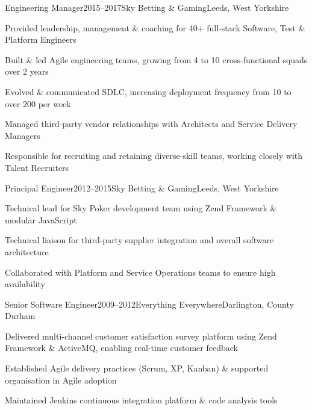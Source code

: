 \documentclass{cv}
\begin{document}

\begin{experience}{Engineering Manager}{2015--2017}{Sky Betting \& Gaming}{Leeds, West Yorkshire}
\item Provided leadership, management \& coaching for 40+ full-stack Software, Test \& Platform Engineers
\item Built \& led Agile engineering teams, growing from 4 to 10 cross-functional squads over 2 years
\item Evolved \& communicated SDLC, increasing deployment frequency from 10 to over 200 per week
\item Managed third-party vendor relationships with Architects and Service Delivery Managers
\item Responsible for recruiting and retaining diverse-skill teams, working closely with Talent Recruiters
\end{experience}


\begin{experience}{Principal Engineer}{2012--2015}{Sky Betting \& Gaming}{Leeds, West Yorkshire}
\item Technical lead for Sky Poker development team using Zend Framework \& modular JavaScript
\item Technical liaison for third-party supplier integration and overall software architecture
\item Collaborated with Platform and Service Operations teams to ensure high availability
\end{experience}


\begin{experience}{Senior Software Engineer}{2009--2012}{Everything Everywhere}{Darlington, County Durham}
\item Delivered multi-channel customer satisfaction survey platform using Zend Framework \& ActiveMQ,
      enabling real-time customer feedback
\item Established Agile delivery practices (Scrum, XP, Kanban) \& supported organisation in Agile adoption
\item Maintained Jenkins continuous integration platform \& code analysis tools
\end{experience}
\end{document}
